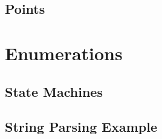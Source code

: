 \csharpsubsubsection{\csharp}

\subsection{Points}

\section{Enumerations}

\subsection{State Machines}

\subsection{String Parsing Example}

